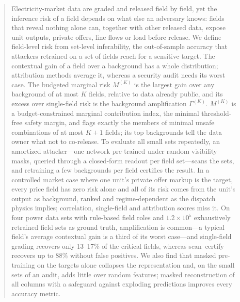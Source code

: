 \begin{abstract}
Electricity-market data are graded and released field by field, yet the inference risk of a field
depends on what else an adversary knows: fields that reveal nothing alone can, together with other
released data, expose unit outputs, private offers, line flows or load before release. We define
field-level risk from set-level inferability, the out-of-sample accuracy that attackers retrained on
a set of fields reach for a sensitive target. The contextual gain of a field over a background has a
whole distribution; attribution methods average it, whereas a security audit needs its worst case.
The budgeted marginal risk $M^{(K)}$ is the largest gain over any background of at most $K$ fields,
relative to data already public, and its excess over single-field risk is the background
amplification $\Gamma^{(K)}$. $M^{(K)}$ is a budget-constrained marginal contribution index, the
minimal threshold-free safety margin, and flags exactly the members of minimal unsafe combinations of
at most $K+1$ fields; its top backgrounds tell the data owner what not to co-release. To evaluate all
small sets repeatedly, an amortized attacker---one network pre-trained under random visibility masks,
queried through a closed-form readout per field set---scans the sets, and retraining a few backgrounds
per field certifies the result. In a controlled market case where one unit's private offer markup is
the target, every price field has zero risk alone and all of its risk comes from the unit's output as
background, ranked and regime-dependent as the dispatch physics implies; correlation, single-field and
attribution scores miss it. On four power data sets with rule-based field roles and
$1.2\times10^5$ exhaustively retrained field sets as ground truth, amplification is common---a typical
field's average contextual gain is a third of its worst case---and single-field grading recovers only
13--17\% of the critical fields, whereas scan--certify recovers up to 88\% without false positives.
We also find that masked pre-training on the targets alone collapses the representation and, on the
small sets of an audit, adds little over random features; masked reconstruction of all columns with a safeguard against
exploding predictions improves every accuracy metric.
\end{abstract}
